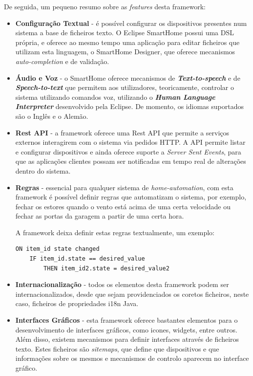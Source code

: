 De seguida, um pequeno resumo sobre as \textit{features} desta framework:

\begin{itemize}
\item \textbf{Configuração Textual} - é possível configurar os dispositivos presentes num sistema a base de ficheiros texto. O Eclipse SmartHome possui uma DSL própria, e oferece ao mesmo tempo uma aplicação para editar ficheiros que utilizam esta linguagem, o SmartHome Designer, que oferece mecanismos \textit{auto-completion} e de validação.

\item \textbf{Áudio e Voz} - o SmartHome oferece mecanismos de \textbf{\textit{Text-to-speech}} e de \textbf{\textit{Speech-to-text}} que permitem aos utilizadores, teoricamente, controlar o sistema utilizando comandos voz, utilizando o \textbf{\textit{Human Language Interpreter}} desenvolvido pela Eclipse. De momento, os idiomas suportados são o Inglês e o Alemão.

\item \textbf{Rest API} - a framework oferece uma Rest API que permite a serviços externos interagirem com o sistema via pedidos HTTP. A API permite listar e configurar dispositivos e ainda oferece suporte a \textit{Server Sent Events}\cite{sse}, para que as aplicações clientes possam ser notificadas em tempo real de alterações dentro do sistema.

\item \textbf{Regras} - essencial para qualquer sistema de \textit{home-automation}, com esta framework é possível definir regras que automatizam o sistema, por exemplo, fechar os estores quando o vento está acima de uma certa velocidade ou fechar as portas da garagem a partir de uma certa hora.

\newpage

A framework deixa definir estas regras textualmente, um exemplo:

\begin{Verbatim}
ON item_id state changed
    IF item_id.state == desired_value
        THEN item_id2.state = desired_value2
\end{Verbatim}

\item \textbf{Internacionalização} - todos os elementos desta framework podem ser internacionalizados, desde que sejam providenciados os coretos ficheiros, neste caso, ficheiros de propriedades i18n Java.

\item \textbf{Interfaces Gráficos} - esta framework oferece bastantes elementos para o desenvolvimento de interfaces gráficos, como icones, widgets, entre outros. Além disso, existem mecanismos para definir interfaces através de ficheiros texto. Estes ficheiros são \textit{sitemaps}, que define que dispositivos e que informações sobre os mesmos e mecanismos de controlo aparecem no interface gráfico.


\end{itemize}
